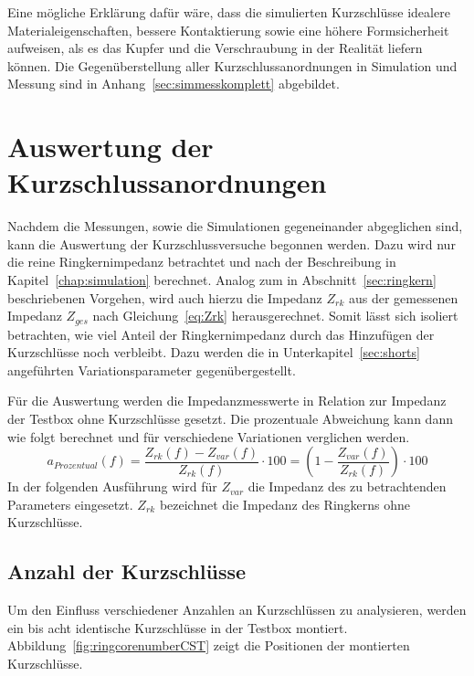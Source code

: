 Eine m\"ogliche Erkl\"arung daf\"ur w\"are, dass die simulierten Kurzschl\"usse idealere Materialeigenschaften, bessere Kontaktierung sowie eine h\"ohere Formsicherheit aufweisen, als es das Kupfer und die Verschraubung in der Realit\"at liefern k\"onnen. Die Gegen\"uberstellung aller Kurzschlussanordnungen in Simulation und Messung sind in Anhang~\ref{sec:simmesskomplett} abgebildet.


\section{Auswertung der Kurzschlussanordnungen}
Nachdem die Messungen, sowie die Simulationen gegeneinander abgeglichen sind, kann die Auswertung der Kurzschlussversuche begonnen werden. Dazu wird nur die reine Ringkernimpedanz betrachtet und nach der Beschreibung in Kapitel~\ref{chap:simulation} berechnet. Analog zum in Abschnitt~\ref{sec:ringkern} beschriebenen Vorgehen, wird auch hierzu die Impedanz $Z_{rk}$ aus der gemessenen Impedanz $Z_{ges}$ nach Gleichung~\ref{eq:Zrk} herausgerechnet. Somit l\"asst sich isoliert betrachten, wie viel Anteil der Ringkernimpedanz durch das Hinzuf\"ugen der Kurzschl\"usse noch verbleibt. Dazu  werden die in Unterkapitel~\ref{sec:shorts} angef\"uhrten Variationsparameter gegenübergestellt.
\par
Für die Auswertung werden die Impedanzmesswerte in Relation zur Impedanz der Testbox ohne Kurzschlüsse gesetzt. Die prozentuale Abweichung kann dann wie folgt berechnet und für verschiedene Variationen verglichen werden.
\begin{equation}
	a_{Prozentual}(f) = \frac{Z_{rk}(f) - Z_{var}(f)}{Z_{rk}(f)}\cdot 100 = \left(1-\frac{Z_{var}(f)}{Z_{rk}(f)}\right)\cdot 100
	\label{eq:maxdiffpercent}
\end{equation}
In der folgenden Ausführung wird für $Z_{var}$ die Impedanz des zu betrachtenden Parameters eingesetzt. $Z_{rk}$ bezeichnet die Impedanz des Ringkerns ohne Kurzschl\"usse.

\subsection{Anzahl der Kurzschl\"usse}
Um den Einfluss verschiedener Anzahlen an Kurzschl\"ussen zu analysieren, werden ein bis acht identische Kurzschl\"usse in der Testbox montiert. Abbildung~\ref{fig:ringcorenumberCST} zeigt die Positionen der montierten Kurzschl\"usse.

